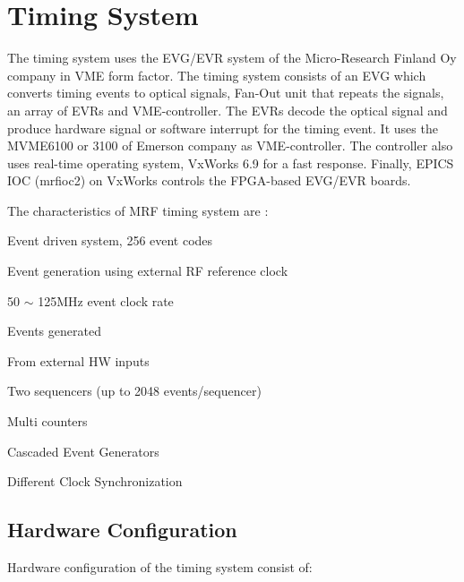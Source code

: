 \documentclass[a4paper,
              ]{jacow}
\begin{document}
\section{Timing System}
The timing system uses the EVG/EVR system of the Micro-Research Finland Oy company in VME form factor. The timing system consists of an EVG which converts timing events to optical signals,   Fan-Out unit that repeats the signals, an array of EVRs and VME-controller. The EVRs decode the optical signal and produce hardware signal or software interrupt for the timing event. It uses the MVME6100 or 3100 of Emerson company as VME-controller. The controller also uses real-time operating system, VxWorks 6.9 for a fast response. Finally, EPICS IOC (mrfioc2) on VxWorks controls the FPGA-based EVG/EVR boards.

\hfill\break
The characteristics of MRF timing system are :
\begin{Itemize}
	\item Event driven system, 256 event codes
	\item Event generation using external RF reference clock
	\item 50 $\sim$  125MHz event clock rate
	\item Events generated
	\begin{Itemize}
		\item From external HW inputs
		\item Two sequencers (up to 2048 events/sequencer)
		\item Multi counters
	\end{Itemize}
	\item Cascaded Event Generators
	\item Different Clock Synchronization
\end{Itemize}

\subsection{Hardware Configuration}

Hardware configuration of the timing system consist of:
\end{document}
